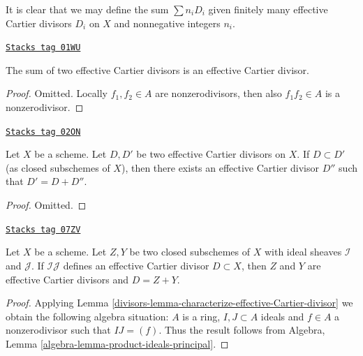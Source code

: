 It is clear that we may define the sum $\sum n_iD_i$ given
finitely many effective Cartier divisors $D_i$ on $X$
and nonnegative integers $n_i$.

\begin{lemma}
\label{divisors-lemma-sum-effective-Cartier-divisors}
\href{https://stacks.math.columbia.edu/tag/01WU}{\texttt{Stacks tag 01WU}}

The sum of two effective Cartier divisors is an effective
Cartier divisor.
\end{lemma}

\begin{proof}
Omitted. Locally $f_1, f_2 \in A$ are nonzerodivisors, then also
$f_1f_2 \in A$ is a nonzerodivisor.
\end{proof}

\begin{lemma}
\label{divisors-lemma-difference-effective-Cartier-divisors}
\href{https://stacks.math.columbia.edu/tag/02ON}{\texttt{Stacks tag 02ON}}

Let $X$ be a scheme.
Let $D, D'$ be two effective Cartier divisors on $X$.
If $D \subset D'$ (as closed subschemes of $X$), then
there exists an effective Cartier divisor $D''$ such
that $D' = D + D''$.
\end{lemma}

\begin{proof}
Omitted.
\end{proof}

\begin{lemma}
\label{divisors-lemma-sum-closed-subschemes-effective-Cartier}
\href{https://stacks.math.columbia.edu/tag/07ZV}{\texttt{Stacks tag 07ZV}}

Let $X$ be a scheme. Let $Z, Y$ be two closed subschemes of $X$
with ideal sheaves $\mathcal{I}$ and $\mathcal{J}$. If $\mathcal{I}\mathcal{J}$
defines an effective Cartier divisor $D \subset X$, then $Z$ and $Y$
are effective Cartier divisors and $D = Z + Y$.
\end{lemma}

\begin{proof}

Applying Lemma \ref{divisors-lemma-characterize-effective-Cartier-divisor} we obtain
the following algebra situation: $A$ is a ring, $I, J \subset A$
ideals and $f \in A$ a nonzerodivisor such that $IJ = (f)$.
Thus the result follows from
Algebra, Lemma \ref{algebra-lemma-product-ideals-principal}.
\end{proof}

